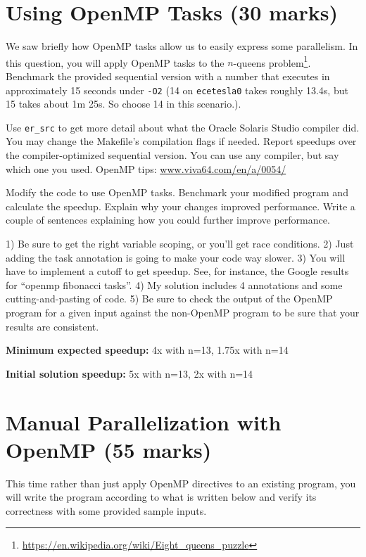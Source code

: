 \documentclass[letterpaper,10pt]{article}
\begin{document}
\section{Using OpenMP Tasks (30 marks)}

We saw briefly how OpenMP tasks allow us to easily express some parallelism.
In this question, you will apply OpenMP tasks to the $n$-queens
problem\footnote{\url{https://en.wikipedia.org/wiki/Eight\_queens\_puzzle}}.
Benchmark the provided sequential version with a number that executes in approximately
15 seconds under {\tt -O2} (14 on {\tt ecetesla0} takes roughly 13.4s, but 15 takes about 1m 25s. 
So choose 14 in this scenario.).

 Use {\tt er\_src} to get more detail about what the Oracle
Solaris Studio compiler did.  You may change the
Makefile's compilation flags if needed. Report speedups over the
compiler-optimized sequential version.  You can use any compiler, but
say which one you used. OpenMP tips:
  \url{www.viva64.com/en/a/0054/}

Modify the code to use OpenMP tasks. Benchmark your modified program
and calculate the speedup. Explain why your
changes improved performance. Write a couple of sentences explaining how
you could further improve performance.

\vspace*{1em}
 1) Be sure to get the right variable scoping, or
you'll get race conditions. 2) Just adding the task annotation is going
to make your code way slower. 3) You will have to implement a cutoff to
get speedup. See, for instance, the Google results for ``openmp
fibonacci tasks''. 4) My solution includes 4 annotations and some
cutting-and-pasting of code. 5) Be sure to check the output of the
OpenMP program for a given input against the non-OpenMP program to be
sure that your results are consistent.

\squishlist
  \item {\bf Minimum expected speedup:} 4x with n=13, 1.75x with n=14 
  \item {\bf Initial solution speedup:} 5x with n=13, 2x with n=14
\squishend

\newpage

\section{Manual Parallelization with OpenMP (55 marks)}

This time rather than just apply OpenMP directives to an existing program, you will write the program according to what is written below and verify its correctness with some provided sample inputs.
\end{document}
